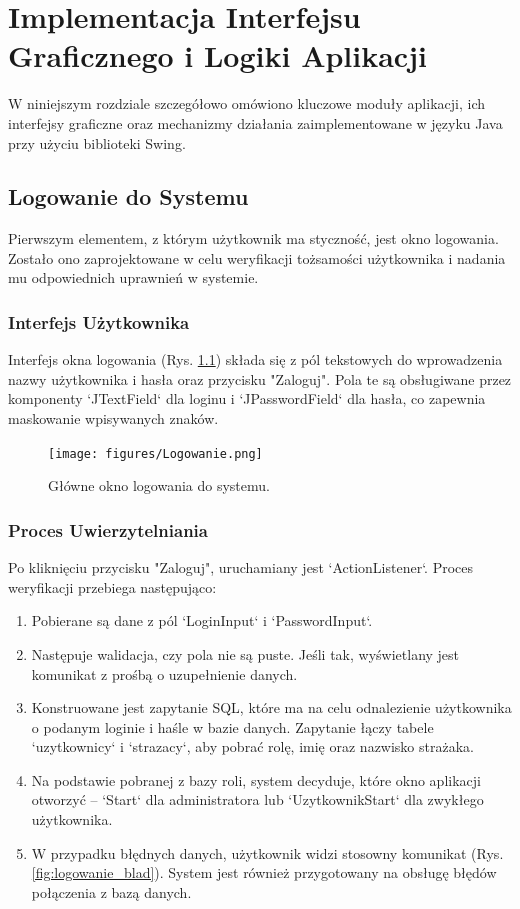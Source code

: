 \chapter{Implementacja Interfejsu Graficznego i Logiki Aplikacji}
\label{chap:implementacja}

W niniejszym rozdziale szczegółowo omówiono kluczowe moduły aplikacji, ich interfejsy graficzne oraz mechanizmy działania zaimplementowane w języku Java przy użyciu biblioteki Swing.

\section{Logowanie do Systemu}
\label{sec:logowanie}

Pierwszym elementem, z którym użytkownik ma styczność, jest okno logowania. Zostało ono zaprojektowane w celu weryfikacji tożsamości użytkownika i nadania mu odpowiednich uprawnień w systemie.

\subsection{Interfejs Użytkownika}

Interfejs okna logowania (Rys. \ref{fig:logowanie}) składa się z pól tekstowych do wprowadzenia nazwy użytkownika i hasła oraz przycisku "Zaloguj". Pola te są obsługiwane przez komponenty `JTextField` dla loginu i `JPasswordField` dla hasła, co zapewnia maskowanie wpisywanych znaków.

\begin{figure}[H]
	\centering
	\texttt{[image: figures/Logowanie.png]}
	\caption{Główne okno logowania do systemu.}
	\label{fig:logowanie}
\end{figure}

\subsection{Proces Uwierzytelniania}

Po kliknięciu przycisku "Zaloguj", uruchamiany jest `ActionListener`. Proces weryfikacji przebiega następująco:
\begin{enumerate}
	\item Pobierane są dane z pól `LoginInput` i `PasswordInput`.
	\item Następuje walidacja, czy pola nie są puste. Jeśli tak, wyświetlany jest komunikat z prośbą o uzupełnienie danych.
	\item Konstruowane jest zapytanie SQL, które ma na celu odnalezienie użytkownika o podanym loginie i haśle w bazie danych. Zapytanie łączy tabele `uzytkownicy` i `strazacy`, aby pobrać rolę, imię oraz nazwisko strażaka.
	\item Na podstawie pobranej z bazy roli, system decyduje, które okno aplikacji otworzyć – `Start` dla administratora lub `UzytkownikStart` dla zwykłego użytkownika.
	\item W przypadku błędnych danych, użytkownik widzi stosowny komunikat (Rys. \ref{fig:logowanie_blad}). System jest również przygotowany na obsługę błędów połączenia z bazą danych.
\end{enumerate}

